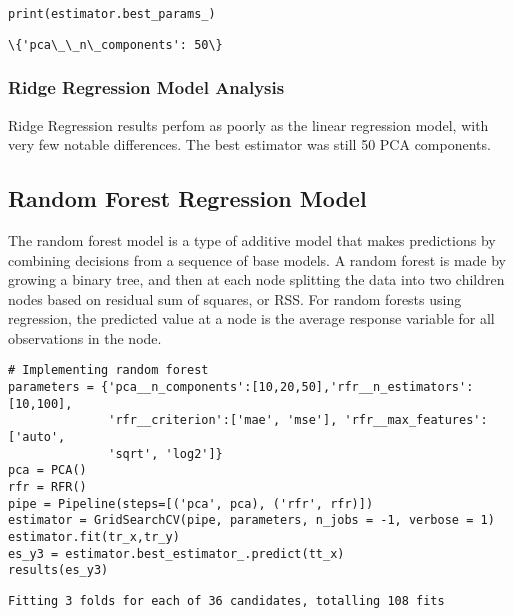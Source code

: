 \documentclass{article}
\begin{document}
\begin{lstlisting}
print(estimator.best_params_)
\end{lstlisting}

\begin{Verbatim}[commandchars=\\\{\}]
\{'pca\_\_n\_components': 50\}

\end{Verbatim}

\hypertarget{ridge-regression-model-analysis}{%
	\subsubsection{Ridge Regression Model
		Analysis}\label{ridge-regression-model-analysis}}

Ridge Regression results perfom as poorly as the linear regression
model, with very few notable differences. The best estimator was still
50 PCA components.

\hypertarget{random-forest-regression-model}{%
	\subsection{Random Forest Regression Model
	}\label{random-forest-regression-model-}}

The random forest model is a type of
additive model that makes predictions by combining decisions from a
sequence of base models. A random forest is made by growing a binary
tree, and then at each node splitting the data into two children nodes
based on residual sum of squares, or RSS. For random forests using
regression, the predicted value at a node is the average response
variable for all observations in the node.

\begin{lstlisting}
# Implementing random forest
parameters = {'pca__n_components':[10,20,50],'rfr__n_estimators':[10,100],
              'rfr__criterion':['mae', 'mse'], 'rfr__max_features':['auto',
              'sqrt', 'log2']}
pca = PCA()
rfr = RFR()
pipe = Pipeline(steps=[('pca', pca), ('rfr', rfr)])
estimator = GridSearchCV(pipe, parameters, n_jobs = -1, verbose = 1)
estimator.fit(tr_x,tr_y)
es_y3 = estimator.best_estimator_.predict(tt_x)
results(es_y3)
\end{lstlisting}

\begin{Verbatim}[commandchars=\\\{\}]
Fitting 3 folds for each of 36 candidates, totalling 108 fits

\end{Verbatim}
\end{document}
